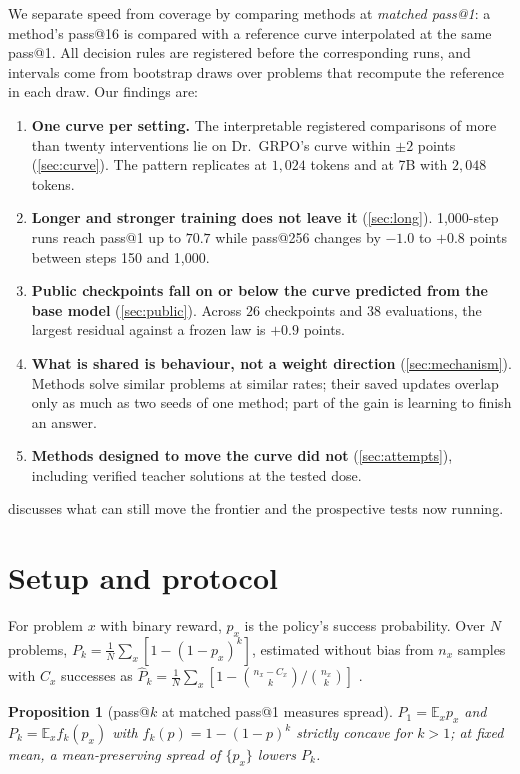\documentclass{article}
\theoremstyle{plain}
\newtheorem{proposition}[theorem]{Proposition}
\newcommand{\E}{\mathbb E}
\begin{document}
We separate speed from coverage by comparing methods at \emph{matched pass@1}: a method's pass@16 is compared with a reference curve interpolated at the same pass@1. All decision rules are registered before the corresponding runs, and intervals come from bootstrap draws over problems that recompute the reference in each draw. Our findings are:

\begin{enumerate}[leftmargin=*,itemsep=1pt,topsep=2pt]
\item \textbf{One curve per setting.} The interpretable registered comparisons of more than twenty interventions lie on Dr.\ GRPO's curve within $\pm2$ points (\cref{sec:curve}). The pattern replicates at $1{,}024$ tokens and at 7B with $2{,}048$ tokens.
\item \textbf{Longer and stronger training does not leave it} (\cref{sec:long}). 1,000-step runs reach pass@1 up to $70.7$ while pass@256 changes by $-1.0$ to $+0.8$ points between steps 150 and 1,000.
\item \textbf{Public checkpoints fall on or below the curve predicted from the base model} (\cref{sec:public}). Across $26$ checkpoints and $38$ evaluations, the largest residual against a frozen law is $+0.9$ points.
\item \textbf{What is shared is behaviour, not a weight direction} (\cref{sec:mechanism}). Methods solve similar problems at similar rates; their saved updates overlap only as much as two seeds of one method; part of the gain is learning to finish an answer.
\item \textbf{Methods designed to move the curve did not} (\cref{sec:attempts}), including verified teacher solutions at the tested dose.
\end{enumerate}
 discusses what can still move the frontier and the prospective tests now running.

\section{Setup and protocol}\label{sec:setup}
For problem $x$ with binary reward, $p_x$ is the policy's success probability. Over $N$ problems, $P_k=\frac1N\sum_x[1-(1-p_x)^k]$, estimated without bias from $n_x$ samples with $C_x$ successes as $\widehat P_k=\frac1N\sum_x[1-\binom{n_x-C_x}{k}/\binom{n_x}{k}]$ \citep{chen2021codex}.

\begin{proposition}[pass@$k$ at matched pass@1 measures spread]\label{prop:spread}
$P_1=\E_xp_x$ and $P_k=\E_xf_k(p_x)$ with $f_k(p)=1-(1-p)^k$ strictly concave for $k>1$; at fixed mean, a mean-preserving spread of $\{p_x\}$ lowers $P_k$.
\end{proposition}
\end{document}
